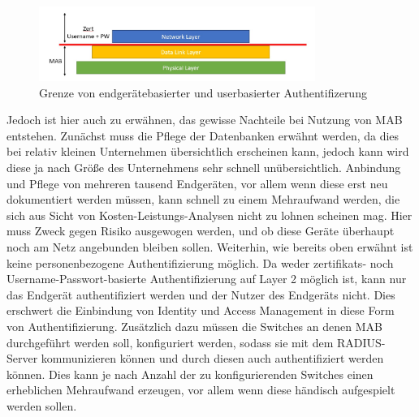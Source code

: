 \documentclass[conference]{IEEEtran}
\begin{document}
\begin{figure}[hbt]
	\centering
	\includegraphics[width=9cm]{figures/MAB_Layer_2.jpg}
	\caption{Grenze von endgerätebasierter und userbasierter Authentifizerung}
	\label{fig:mab}
\end{figure}

Jedoch ist hier auch zu erwähnen, das gewisse Nachteile bei Nutzung von MAB entstehen. Zunächst muss die Pflege der Datenbanken erwähnt werden, da dies bei relativ kleinen Unternehmen übersichtlich erscheinen kann, jedoch kann wird diese ja nach Größe des Unternehmens sehr schnell unübersichtlich. Anbindung und Pflege von mehreren tausend Endgeräten, vor allem wenn diese erst neu dokumentiert werden müssen, kann schnell zu einem Mehraufwand werden, die sich aus Sicht von Kosten-Leistungs-Analysen nicht zu lohnen scheinen mag. Hier muss Zweck gegen Risiko ausgewogen werden, und ob diese Geräte überhaupt noch am Netz angebunden bleiben sollen. Weiterhin, wie bereits oben erwähnt ist keine personenbezogene Authentifizierung möglich. Da weder zertifikats- noch Username-Passwort-basierte Authentifizierung auf Layer 2 möglich ist, kann nur das Endgerät authentifiziert werden und der Nutzer des Endgeräts nicht. Dies erschwert die Einbindung von Identity und Access Management in diese Form von Authentifizierung. Zusätzlich dazu müssen die Switches an denen MAB durchgeführt werden soll, konfiguriert werden, sodass sie mit dem RADIUS-Server kommunizieren können und durch diesen auch authentifiziert werden können. Dies kann je nach Anzahl der zu konfigurierenden Switches einen erheblichen Mehraufwand erzeugen, vor allem wenn diese händisch aufgespielt werden sollen. 
\end{document}
